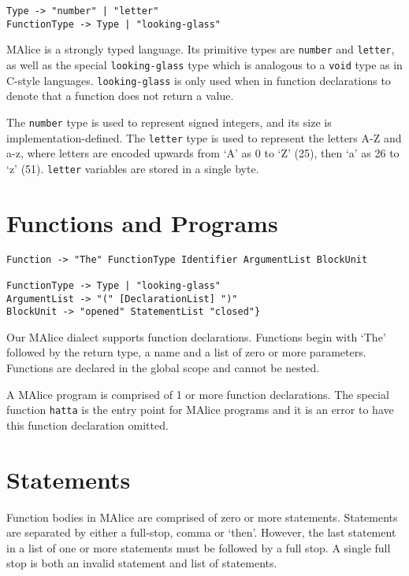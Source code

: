\documentclass[a4wide, 11pt]{article}
\begin{document}
\begin{verbatim}
Type -> "number" | "letter"
FunctionType -> Type | "looking-glass"
\end{verbatim}

MAlice is a strongly typed language. Its primitive types are \texttt{number} and \texttt{letter}, as well as the special \texttt{looking-glass} type which is analogous to a \texttt{void} type as in C-style languages. \texttt{looking-glass} is only used when in function declarations to denote that a function does not return a value.

The \texttt{number} type is used to represent signed integers, and its size is implementation-defined. The \texttt{letter} type is used to represent the letters A-Z and a-z, where letters are encoded upwards from `A' as 0 to `Z' (25), then `a' as 26 to `z' (51). \texttt{letter} variables are stored in a single byte.

\section{Functions and Programs}

\begin{verbatim}
Function -> "The" FunctionType Identifier ArgumentList BlockUnit

FunctionType -> Type | "looking-glass"
ArgumentList -> "(" [DeclarationList] ")"
BlockUnit -> "opened" StatementList "closed"}
\end{verbatim}

Our MAlice dialect supports function declarations. Functions begin with `The' followed by the return type, a name and a list of zero or more parameters. Functions are declared in the global scope and cannot be nested.

A MAlice program is comprised of 1 or more function declarations. The special function \texttt{hatta} is the entry point for MAlice programs and it is an error to have this function declaration omitted.

\section{Statements}

Function bodies in MAlice are comprised of zero or more statements. Statements are separated by either a full-stop, comma or `then'. However, the last statement in a list of one or more statements must be followed by a full stop. A single full stop is both an invalid statement and list of statements.
  
\end{document}
